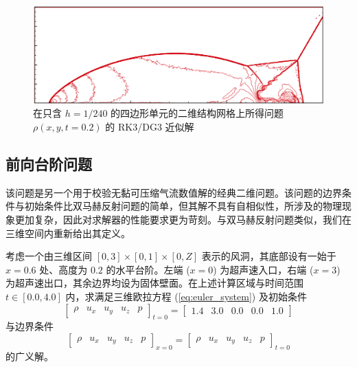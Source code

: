 \begin{figure}[h!]
\begin{centering}
\includegraphics[width=1\textwidth]{figures/double_mach/zhong}
\par\end{centering}
\caption{\label{fig:double_mach_p=00003D3_zhong}在只含 $h=1/240$ 的四边形单元的二维结构网格上所得问题
$\rho(x,y,t=0.2)$ 的 RK3/DG3 近似解}
\end{figure}


\subsection{前向台阶问题}

该问题是另一个用于校验无黏可压缩气流数值解的经典二维问题。该问题的边界条件与初始条件比双马赫反射问题的简单，但其解不具有自相似性，所涉及的物理现象更加复杂，因此对求解器的性能要求更为苛刻。与双马赫反射问题类似，我们在三维空间内重新给出其定义。
\begin{problem}
[前向台阶]\label{prob:=00524D=005411=0053F0=009636}考虑一个由三维区间
$[0,3]\times[0,1]\times[0,Z]$ 表示的风洞，其底部设有一始于 $x=0.6$ 处、高度为 $0.2$
的水平台阶。左端 ($x=0$) 为超声速入口，右端 ($x=3$) 为超声速出口，其余边界均设为固体壁面。在上述计算区域与时间范围
$t\in[0.0,4.0]$ 内，求满足三维欧拉方程 (\ref{eq:euler_system}) 及初始条件
\begin{equation}
\begin{bmatrix}\rho & u_{x} & u_{y} & u_{z} & p\end{bmatrix}_{t=0}=\begin{bmatrix}1.4 & 3.0 & 0.0 & 0.0 & 1.0\end{bmatrix}
\end{equation}
与边界条件
\begin{equation}
\begin{bmatrix}\rho & u_{x} & u_{y} & u_{z} & p\end{bmatrix}_{x=0}=\begin{bmatrix}\rho & u_{x} & u_{y} & u_{z} & p\end{bmatrix}_{t=0}
\end{equation}
的广义解。
\end{problem}

